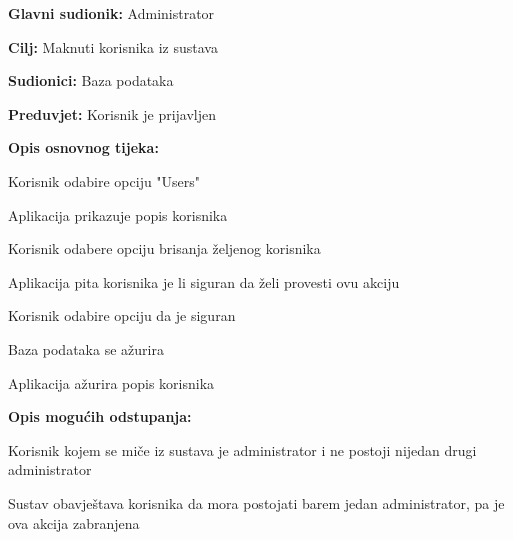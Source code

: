 					\noindent {}
					\begin{packed_item}

						\item \textbf{Glavni sudionik:} Administrator
						\item \textbf{Cilj:} Maknuti korisnika iz sustava
						\item \textbf{Sudionici:} Baza podataka
						\item \textbf{Preduvjet:} Korisnik je prijavljen
						\item \textbf{Opis osnovnog tijeka:}

						\item[] \begin{packed_enum}

							\item Korisnik odabire opciju "Users"
							\item Aplikacija prikazuje popis korisnika
							\item Korisnik odabere opciju brisanja željenog korisnika
							\item Aplikacija pita korisnika je li siguran da želi provesti ovu akciju
							\item Korisnik odabire opciju da je siguran
							\item Baza podataka se ažurira
							\item Aplikacija ažurira popis korisnika

						\end{packed_enum}

						\item \textbf{Opis mogućih odstupanja:}

						\item[] \begin{packed_item}

							\item[3.a] Korisnik kojem se miče iz sustava je administrator i ne postoji nijedan
							drugi administrator
							\item[] \begin{packed_enum}

								\item Sustav obavještava korisnika da mora postojati
								barem jedan administrator, pa je ova akcija zabranjena

							\end{packed_enum}

						\end{packed_item}
					\end{packed_item}

